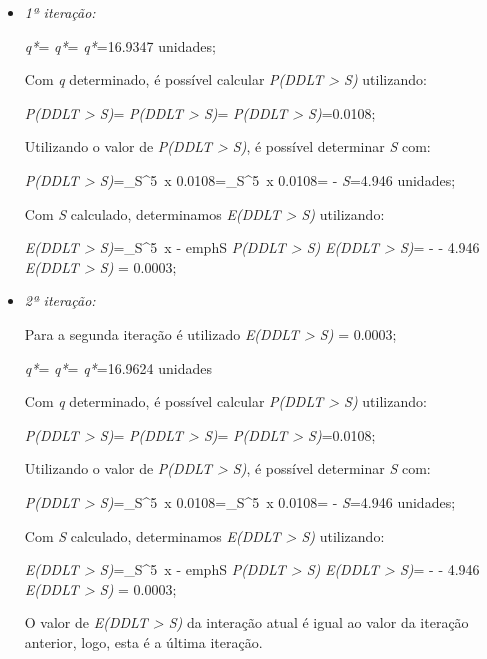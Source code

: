 \begin{itemize}
\item \emph{1ª iteração:}

	\emph{q*}=
	\emph{q*}=
	\emph{q*}=16.9347  unidades;

	Com \emph{q} determinado, é possível calcular \emph{P(DDLT > S)} utilizando:

	\emph{P(DDLT > S)}=
	\emph{P(DDLT > S)}=
	\emph{P(DDLT > S)}=0.0108;

	Utilizando o valor de \emph{P(DDLT > S)}, é possível determinar \emph{S} com:
	
	\emph{P(DDLT > S)}=\int_S^5 \,x
	0.0108=\int_S^5 \,x
	0.0108= - 
	\emph{S}=4.946 unidades;

	Com \emph{S} calculado, determinamos \emph{E(DDLT > S)} utilizando:
	
	\emph{E(DDLT > S)}=\int_S^5 \,x - emph{S} \times \emph{P(DDLT > S)}
	\emph{E(DDLT > S)}= -  - 4.946 
	\emph{E(DDLT > S)} = 0.0003;


\item \emph{2ª iteração:}
	
	Para a segunda iteração é utilizado \emph{E(DDLT > S)} = 0.0003;

	\emph{q*}=
	\emph{q*}=
	\emph{q*}=16.9624  unidades

	Com \emph{q} determinado, é possível calcular \emph{P(DDLT > S)} utilizando:

	\emph{P(DDLT > S)}=
	\emph{P(DDLT > S)}=
	\emph{P(DDLT > S)}=0.0108;

	Utilizando o valor de \emph{P(DDLT > S)}, é possível determinar \emph{S} com:
	
	\emph{P(DDLT > S)}=\int_S^5 \,x
	0.0108=\int_S^5 \,x
	0.0108= - 
	\emph{S}=4.946 unidades;

	Com \emph{S} calculado, determinamos \emph{E(DDLT > S)} utilizando:
	
	\emph{E(DDLT > S)}=\int_S^5 \,x - emph{S} \times \emph{P(DDLT > S)}
	\emph{E(DDLT > S)}= -  - 4.946 
	\emph{E(DDLT > S)} = 0.0003;

	O valor de \emph{E(DDLT > S)} da interação atual é igual ao valor da iteração anterior, logo, esta é a última iteração.

\end{itemize}

